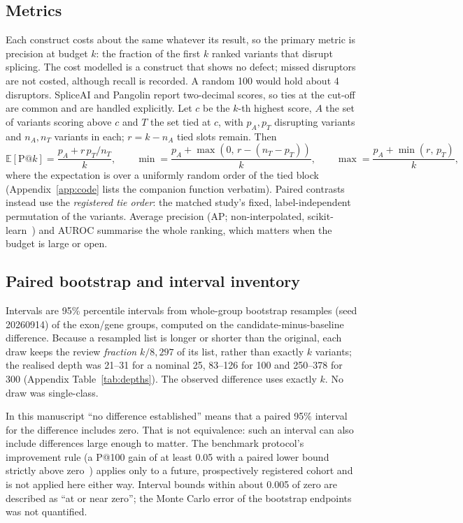 \documentclass[11pt]{article}
\makeatletter
\newcommand{\pk}[1]{P@#1}
\makeatother
\begin{document}
\subsection{Metrics}\label{sec:metrics}
Each construct costs about the same whatever its result, so the primary metric is precision at budget $k$:
the fraction of the first $k$ ranked variants that disrupt splicing. The cost modelled is a construct that
shows no defect; missed disruptors are not costed, although recall is recorded. A random 100 would hold
about 4 disruptors. SpliceAI and Pangolin report two-decimal scores, so ties at the cut-off are common and are
handled explicitly. Let $c$ be the $k$-th highest score, $A$ the set of variants scoring above $c$ and $T$ the
set tied at $c$, with $p_A, p_T$ disrupting variants and $n_A, n_T$ variants in each; $r = k - n_A$ tied slots
remain. Then
\begin{equation}
\mathbb{E}[\mathrm{P@}k] = \frac{p_A + r\,p_T/n_T}{k},\qquad
\min = \frac{p_A + \max(0,\, r-(n_T-p_T))}{k},\qquad
\max = \frac{p_A + \min(r,\, p_T)}{k},
\end{equation}
where the expectation is over a uniformly random order of the tied block (Appendix~\ref{app:code} lists the
companion function verbatim). Paired contrasts instead use the \emph{registered tie order}: the matched study's
fixed, label-independent permutation of the variants. Average precision (AP; non-interpolated,
scikit-learn~\citep{sklearn_ap}) and AUROC summarise the whole ranking, which matters when the budget is large
or open.

\subsection{Paired bootstrap and interval inventory}\label{sec:stats}
Intervals are 95\% percentile intervals from \Draws{} whole-group bootstrap resamples (seed 20260914) of the
\Groups{} exon/gene groups, computed on the candidate-minus-baseline difference. Because a resampled list is
longer or shorter than the original, each draw keeps the review \emph{fraction} $k/8{,}297$ of its list, rather
than exactly $k$ variants; the realised depth was 21--31 for a nominal 25, 83--126 for 100 and 250--378 for 300
(Appendix Table~\ref{tab:depths}). The observed difference uses exactly $k$. No draw was single-class.

In this manuscript ``no difference established'' means that a paired 95\% interval for the difference includes
zero. That is not equivalence: such an interval can also include differences large enough to matter. The
benchmark protocol's improvement rule (a \pk{100} gain of at least 0.05 with a paired lower bound strictly above
zero~\citep{rb_protocol}) applies only to a future, prospectively registered cohort and is not applied here
either way. Interval bounds within about 0.005 of zero are described as ``at or near zero''; the Monte Carlo
error of the bootstrap endpoints was not quantified.
\end{document}
